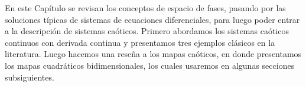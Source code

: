 En este Capítulo se revisan los conceptos de espacio de fases, pasando por las soluciones típicas de sistemas de ecuaciones diferenciales, para luego poder entrar a la descripción de sistemas caóticos. Primero abordamos los sistemas caóticos continuos con derivada continua y presentamos tres ejemplos clásicos en la literatura. Luego hacemos una reseña a los mapas caóticos, en donde presentamos los mapas cuadráticos bidimensionales, los cuales usaremos en algunas secciones subsiguientes.

